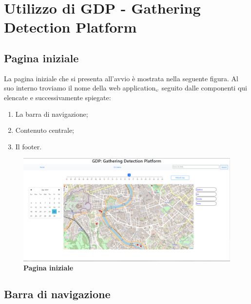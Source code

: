
\chapter{Utilizzo di GDP - Gathering Detection Platform}\label{UtilizzoDiGDPGatheringDetecionPlatform}

\section{Pagina iniziale}\label{UtilizzoDiGDPGatheringDetecionPlatformPaginaIniziale}
La pagina iniziale che si presenta all'avvio è mostrata nella seguente figura.
Al suo interno troviamo il nome della web application$_{\scaleto{G}{3pt}}$ seguito dalle componenti qui elencate e successivamente spiegate:
\begin{enumerate}
	\item La barra di navigazione;
	\item Contenuto centrale;
	\item Il footer.
\end{enumerate}

\begin{center}
	\begin{figure}[H]
		\centering\includegraphics[width=0.9\linewidth]{../immagini/manualeUtente/mainpage.png}
		\caption{\textbf{\textbf{\textbf{Pagina iniziale}}}}
	\end{figure}
\end{center} 

\section{Barra di navigazione}\label{UtilizzoDiGDPGatheringDetecionPlatformBarraDiNavigazione}

